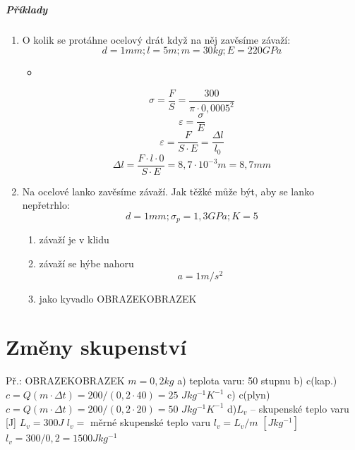 \documentclass{article}
\begin{document}
        \subsubsection{Příklady}
        \begin{enumerate}
          \item O kolik se protáhne ocelový drát když na něj zavěsíme závaží:
          \begin{equation*}
            d = 1 mm;
            l = 5 m;
            m = 30 kg;
            E = 220 GPa
          \end{equation*}
          \begin{itemize}
            \item[]
          \end{itemize}
          \begin{equation*}
            \sigma=\frac{F}{S}=\frac{300}{\pi\cdot0,0005^2}
          \end{equation*}
          \begin{equation*}
            \varepsilon = \frac{\sigma}{E}
          \end{equation*}
          \begin{equation*}
            \varepsilon = \frac{F}{S\cdot E}=\frac{\Delta l}{l_0}
          \end{equation*}
          \begin{equation*}
            \Delta l = \frac{F\cdot l\cdot 0}{S\cdot E}=8,7\cdot 10^{-3} m = 8,7 mm
          \end{equation*}
          \item Na ocelové lanko zavěsíme závaží. Jak těžké může být, aby se lanko nepřetrhlo:
          \begin{equation*}
            d = 1 mm;
            \sigma_p = 1,3 GPa;
            K = 5
          \end{equation*}
          \begin{enumerate}
            \item závaží je v klidu
            \item závaží se hýbe nahoru
            \begin{equation*}
              a = 1 m/s^2
            \end{equation*}
            \item jako kyvadlo OBRAZEKOBRAZEK
          \end{enumerate}
        \end{enumerate}

\part{Změny skupenství}
Př.: OBRAZEKOBRAZEK
$m = 0,2 kg$
a) teplota varu: 50 stupnu
b) c(kap.) $c = Q(m\cdot \Delta t)=200/(0,2 \cdot 40) = 25$ $Jkg^{-1}K^{-1}$
c) c(plyn) $c = Q(m\cdot \Delta t)=200/(0,2 \cdot 20) = 50$ $Jkg^{-1}K^{-1}$
d)$L_v$ -- skupenské teplo varu [J]
$L_v = 300 J$
$l_v = $ měrné skupenské teplo varu $l_v = L_v/m$ $[Jkg^{-1}]$
$l_v = 300/0,2 = 1500 Jkg^{-1}$
\end{document}
